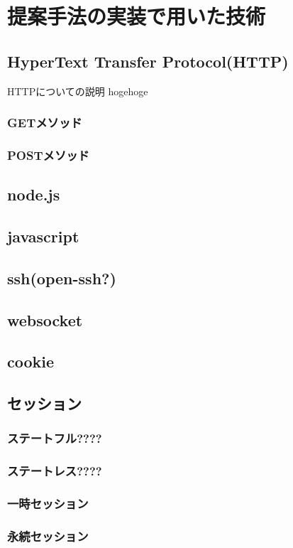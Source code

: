 \section{提案手法の実装で用いた技術}
    \subsection{HyperText Transfer Protocol(HTTP)}
        HTTPについての説明 hogehoge
        \subsubsection{GETメソッド}
        \subsubsection{POSTメソッド}
    \subsection{node.js}
    \subsection{javascript}
    \subsection{ssh(open-ssh?)}
    \subsection{websocket}
    \subsection{cookie}
    \subsection{セッション}
        \subsubsection{ステートフル????}
        \subsubsection{ステートレス????}
        \subsubsection{一時セッション}%
        \subsubsection{永続セッション}%
